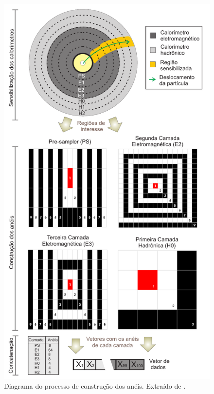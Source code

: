 \begin{figure}[p]
\label{fig:cons_aneis}
\centering
\includegraphics[height=0.9\textheight]{imagens/cons_aneis.pdf}
\caption[Diagrama do processo de construção dos anéis.]
{Diagrama do processo de construção dos anéis. Extraído de \cite{tese_eduardo}.}
\end{figure}



